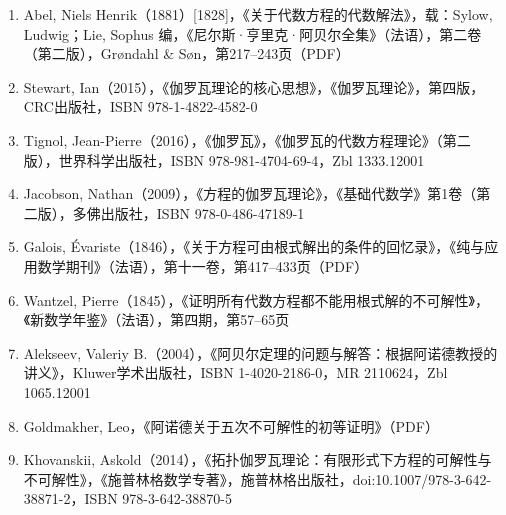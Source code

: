 \begin{enumerate}
\item Abel, Niels Henrik（1881）[1828]，《关于代数方程的代数解法》，载：Sylow, Ludwig；Lie, Sophus 编，《尼尔斯·亨里克·阿贝尔全集》（法语），第二卷（第二版），Grøndahl & Søn，第217–243页（PDF）
\item Stewart, Ian（2015），《伽罗瓦理论的核心思想》，《伽罗瓦理论》，第四版，CRC出版社，ISBN 978-1-4822-4582-0
\item Tignol, Jean-Pierre（2016），《伽罗瓦》，《伽罗瓦的代数方程理论》（第二版），世界科学出版社，ISBN 978-981-4704-69-4，Zbl 1333.12001
\item Jacobson, Nathan（2009），《方程的伽罗瓦理论》，《基础代数学》第1卷（第二版），多佛出版社，ISBN 978-0-486-47189-1
\item Galois, Évariste（1846），《关于方程可由根式解出的条件的回忆录》，《纯与应用数学期刊》（法语），第十一卷，第417–433页（PDF）
\item Wantzel, Pierre（1845），《证明所有代数方程都不能用根式解的不可解性》，《新数学年鉴》（法语），第四期，第57–65页
\item Alekseev, Valeriy B.（2004），《阿贝尔定理的问题与解答：根据阿诺德教授的讲义》，Kluwer学术出版社，ISBN 1-4020-2186-0，MR 2110624，Zbl 1065.12001
\item Goldmakher, Leo，《阿诺德关于五次不可解性的初等证明》（PDF）
\item Khovanskii, Askold（2014），《拓扑伽罗瓦理论：有限形式下方程的可解性与不可解性》，《施普林格数学专著》，施普林格出版社，doi:10.1007/978-3-642-38871-2，ISBN 978-3-642-38870-5
\end{enumerate}